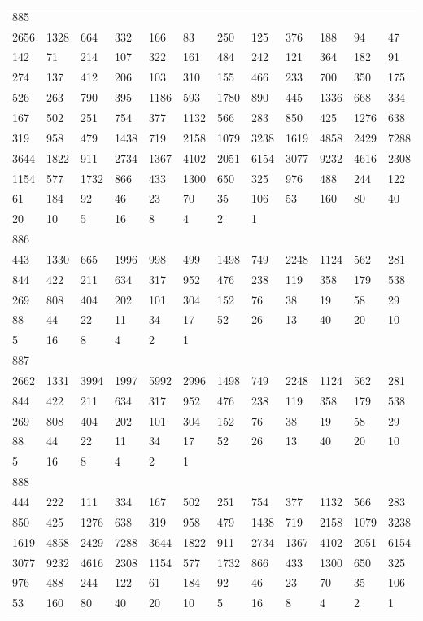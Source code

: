 \begin{longtable}{llllllllllll}
885&&&&&&&&&&&\\
2656& 1328& 664& 332& 166& 83& 250& 125& 376& 188& 94& 47\\
142& 71& 214& 107& 322& 161& 484& 242& 121& 364& 182& 91\\
274& 137& 412& 206& 103& 310& 155& 466& 233& 700& 350& 175\\
526& 263& 790& 395& 1186& 593& 1780& 890& 445& 1336& 668& 334\\
167& 502& 251& 754& 377& 1132& 566& 283& 850& 425& 1276& 638\\
319& 958& 479& 1438& 719& 2158& 1079& 3238& 1619& 4858& 2429& 7288\\
3644& 1822& 911& 2734& 1367& 4102& 2051& 6154& 3077& 9232& 4616& 2308\\
1154& 577& 1732& 866& 433& 1300& 650& 325& 976& 488& 244& 122\\
61& 184& 92& 46& 23& 70& 35& 106& 53& 160& 80& 40\\
20& 10& 5& 16& 8& 4& 2& 1& \\

886&&&&&&&&&&&\\
443& 1330& 665& 1996& 998& 499& 1498& 749& 2248& 1124& 562& 281\\
844& 422& 211& 634& 317& 952& 476& 238& 119& 358& 179& 538\\
269& 808& 404& 202& 101& 304& 152& 76& 38& 19& 58& 29\\
88& 44& 22& 11& 34& 17& 52& 26& 13& 40& 20& 10\\
5& 16& 8& 4& 2& 1& \\

887&&&&&&&&&&&\\
2662& 1331& 3994& 1997& 5992& 2996& 1498& 749& 2248& 1124& 562& 281\\
844& 422& 211& 634& 317& 952& 476& 238& 119& 358& 179& 538\\
269& 808& 404& 202& 101& 304& 152& 76& 38& 19& 58& 29\\
88& 44& 22& 11& 34& 17& 52& 26& 13& 40& 20& 10\\
5& 16& 8& 4& 2& 1& \\

888&&&&&&&&&&&\\
444& 222& 111& 334& 167& 502& 251& 754& 377& 1132& 566& 283\\
850& 425& 1276& 638& 319& 958& 479& 1438& 719& 2158& 1079& 3238\\
1619& 4858& 2429& 7288& 3644& 1822& 911& 2734& 1367& 4102& 2051& 6154\\
3077& 9232& 4616& 2308& 1154& 577& 1732& 866& 433& 1300& 650& 325\\
976& 488& 244& 122& 61& 184& 92& 46& 23& 70& 35& 106\\
53& 160& 80& 40& 20& 10& 5& 16& 8& 4& 2& 1\\


\end{longtable}
